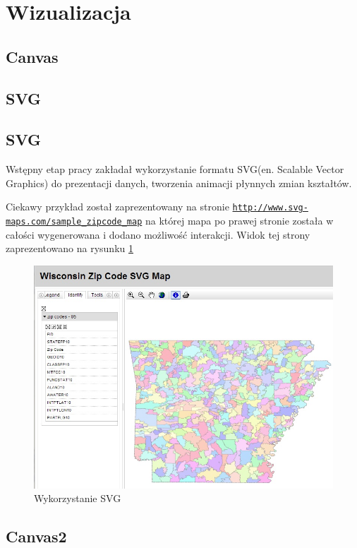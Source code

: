 

\section{Wizualizacja}
\label{sec:wizualizacja}

\subsection{Canvas}
\label{sec:canvas}

\subsection{SVG}
\label{sec:svg}

\subsection{SVG}
\label{subsec:svg}

Wstępny etap pracy zakładał wykorzystanie formatu SVG(en. Scalable Vector Graphics) do prezentacji danych, tworzenia animacji płynnych zmian kształtów.

Ciekawy przykład został zaprezentowany na stronie \underline{\texttt{http://www.svg-maps.com/sample\_zipcode\_map}} na której mapa po prawej stronie została w całości wygenerowana i dodano możliwość interakcji. Widok tej strony zaprezentowano na rysunku \ref{fig:svgmap}

\begin{figure}[H]
  \centering
    \includegraphics[width=120mm]{ge/svgmap.jpg}
  \caption{Wykorzystanie SVG}
  \label{fig:svgmap}
\end{figure}

\subsection{Canvas2}
\label{sec:canvas2}